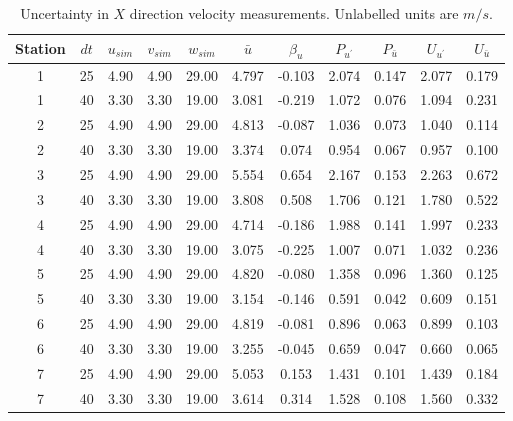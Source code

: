 \begin{table}[H]
\begin{center}
\begin{tabular}{|ccccccccccc|}
	\hline
	Station & $dt$ & $u_{sim}$ & $v_{sim}$ & $w_{sim}$ & $\bar{u}$ & $\beta_u$ & $P_{u^{\prime}}$ & $P_{\bar{u}}$ & $U_{u^{\prime}}$ & $U_{\bar{u}}$\\
	\hline
	1 & 25 & 4.90 & 4.90 & 29.00 & 4.797 & -0.103 & 2.074 & 0.147 & 2.077 & 0.179\\
	1 & 40 & 3.30 & 3.30 & 19.00 & 3.081 & -0.219 & 1.072 & 0.076 & 1.094 & 0.231\\
	2 & 25 & 4.90 & 4.90 & 29.00 & 4.813 & -0.087 & 1.036 & 0.073 & 1.040 & 0.114\\
	2 & 40 & 3.30 & 3.30 & 19.00 & 3.374 & 0.074 & 0.954 & 0.067 & 0.957 & 0.100\\
	3 & 25 & 4.90 & 4.90 & 29.00 & 5.554 & 0.654 & 2.167 & 0.153 & 2.263 & 0.672\\
	3 & 40 & 3.30 & 3.30 & 19.00 & 3.808 & 0.508 & 1.706 & 0.121 & 1.780 & 0.522\\
	4 & 25 & 4.90 & 4.90 & 29.00 & 4.714 & -0.186 & 1.988 & 0.141 & 1.997 & 0.233\\
	4 & 40 & 3.30 & 3.30 & 19.00 & 3.075 & -0.225 & 1.007 & 0.071 & 1.032 & 0.236\\
	5 & 25 & 4.90 & 4.90 & 29.00 & 4.820 & -0.080 & 1.358 & 0.096 & 1.360 & 0.125\\
	5 & 40 & 3.30 & 3.30 & 19.00 & 3.154 & -0.146 & 0.591 & 0.042 & 0.609 & 0.151\\
	6 & 25 & 4.90 & 4.90 & 29.00 & 4.819 & -0.081 & 0.896 & 0.063 & 0.899 & 0.103\\
	6 & 40 & 3.30 & 3.30 & 19.00 & 3.255 & -0.045 & 0.659 & 0.047 & 0.660 & 0.065\\
	7 & 25 & 4.90 & 4.90 & 29.00 & 5.053 & 0.153 & 1.431 & 0.101 & 1.439 & 0.184\\
	7 & 40 & 3.30 & 3.30 & 19.00 & 3.614 & 0.314 & 1.528 & 0.108 & 1.560 & 0.332\\
	\hline
\end{tabular}
\caption{Uncertainty in $X$ direction velocity measurements. Unlabelled units are $m/s$.}
\label{table:uncertainties_u}
\end{center}
\end{table}
